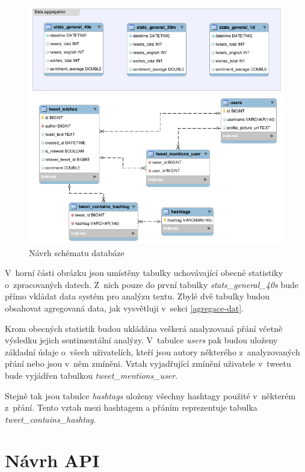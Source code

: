 \documentclass[thesis=B,czech]{FITthesis}[2012/06/26]
\begin{document}
\begin{figure}[ht]
   	\centering
   	\includegraphics[width=1\textwidth]{../db_model.png}
   	\caption{Návrh schématu databáze}
   	\label{fig:db-structure}
\end{figure}

V~horní části obrázku jsou umístěny tabulky uchovávající obecné statistiky o~zpracovaných datech. Z~nich pouze do první tabulky \textit{stats\_general\_40s} bude přímo vkládat data systém pro analýzu textu. Zbylé dvě tabulky budou obsahovat agregovaná data, jak vysvětluji v~sekci \ref{agregace-dat}. 

Krom obecných statistik budou ukládána veškerá analyzovaná přání včetně výsledku jejich sentimentální analýzy. V~tabulce \textit{users} pak budou uloženy základní údaje o~všech uživatelích, kteří jsou autory některého z~analyzovaných přání nebo jsou v~něm zmíněni. Vztah vyjadřující zmínění uživatele v~tweetu bude vyjádřen tabulkou \textit{tweet\_mentions\_user}. 

Stejně tak jsou tabulce \textit{hashtags} uloženy všechny hashtagy použité v~některém z~přání. Tento vztah mezi hashtagem a přáním reprezentuje tabulka \textit{tweet\_contains\_hashtag}.  

\section{Návrh API}
\label{rest}
\end{document}
